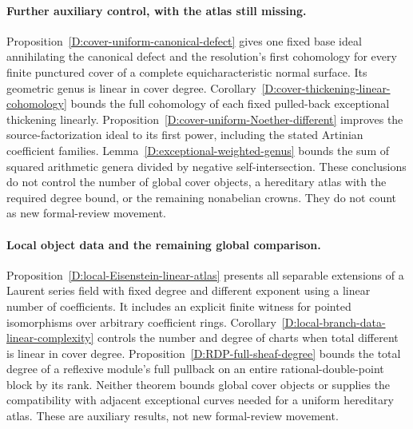 \paragraph{Further auxiliary control, with the atlas still missing.}
Proposition~\ref{D:cover-uniform-canonical-defect} gives one fixed
base ideal annihilating the canonical defect and the resolution's first
cohomology for every finite punctured cover of a complete equicharacteristic
normal surface. Its geometric genus is linear in cover degree.
Corollary~\ref{D:cover-thickening-linear-cohomology} bounds the full
cohomology of each fixed pulled-back exceptional thickening linearly.
Proposition~\ref{D:cover-uniform-Noether-different} improves the
source-factorization ideal to its first power, including the stated
Artinian coefficient families. Lemma~\ref{D:exceptional-weighted-genus}
bounds the sum of squared arithmetic genera divided by negative
self-intersection. These conclusions do not control the number of global
cover objects, a hereditary atlas with the required degree bound, or the
remaining nonabelian crowns. They do not count as new formal-review movement.


\paragraph{Local object data and the remaining global comparison.}
Proposition~\ref{D:local-Eisenstein-linear-atlas} presents all separable
extensions of a Laurent series field with fixed degree and different
exponent using a linear number of coefficients. It includes an explicit
finite witness for pointed isomorphisms over arbitrary coefficient rings.
Corollary~\ref{D:local-branch-data-linear-complexity} controls the number
and degree of charts when total different is linear in cover degree.
Proposition~\ref{D:RDP-full-sheaf-degree} bounds the total degree of a
reflexive module's full pullback on an entire rational-double-point
block by its rank. Neither theorem bounds global cover objects or supplies
the compatibility with adjacent exceptional curves needed for a uniform
hereditary atlas. These are auxiliary results, not new formal-review movement.


